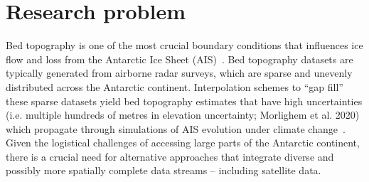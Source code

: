 \chapter{Research problem}\label{review}
Bed topography is one of the most crucial boundary conditions that influences ice flow and loss from the Antarctic Ice Sheet (AIS)~\cite{Morlighem_2020}. Bed topography datasets are typically generated from airborne radar surveys, which are sparse and unevenly distributed across the Antarctic continent. Interpolation schemes to ``gap fill'' these sparse datasets yield bed topography estimates that have high uncertainties (i.e. multiple hundreds of metres in elevation uncertainty; Morlighem et al. 2020) which propagate through simulations of AIS evolution under climate change~\cite{Castleman_2022}. Given the logistical challenges of accessing large parts of the Antarctic continent, there is a crucial need for alternative approaches that integrate diverse and possibly more spatially complete data streams – including satellite data.

